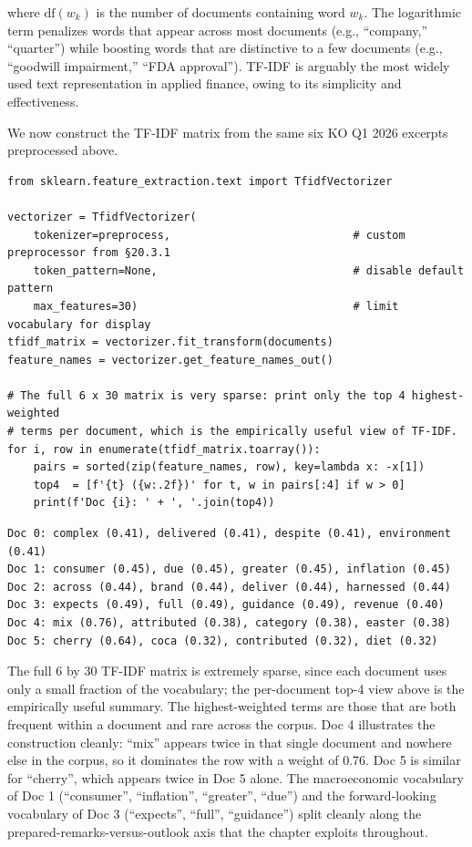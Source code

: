 where $\text{df}(w_k)$ is the number of documents containing word $w_k$. The logarithmic term penalizes words that appear across most documents (e.g., ``company,'' ``quarter'') while boosting words that are distinctive to a few documents (e.g., ``goodwill impairment,'' ``FDA approval''). TF-IDF is arguably the most widely used text representation in applied finance, owing to its simplicity and effectiveness.

We now construct the TF-IDF matrix from the same six KO Q1 2026 excerpts preprocessed above.

\begin{verbatim}
from sklearn.feature_extraction.text import TfidfVectorizer

vectorizer = TfidfVectorizer(
    tokenizer=preprocess,                            # custom preprocessor from §20.3.1
    token_pattern=None,                              # disable default pattern
    max_features=30)                                 # limit vocabulary for display
tfidf_matrix = vectorizer.fit_transform(documents)
feature_names = vectorizer.get_feature_names_out()

# The full 6 x 30 matrix is very sparse: print only the top 4 highest-weighted
# terms per document, which is the empirically useful view of TF-IDF.
for i, row in enumerate(tfidf_matrix.toarray()):
    pairs = sorted(zip(feature_names, row), key=lambda x: -x[1])
    top4  = [f'{t} ({w:.2f})' for t, w in pairs[:4] if w > 0]
    print(f'Doc {i}: ' + ', '.join(top4))
\end{verbatim}

\begin{verbatim}
Doc 0: complex (0.41), delivered (0.41), despite (0.41), environment (0.41)
Doc 1: consumer (0.45), due (0.45), greater (0.45), inflation (0.45)
Doc 2: across (0.44), brand (0.44), deliver (0.44), harnessed (0.44)
Doc 3: expects (0.49), full (0.49), guidance (0.49), revenue (0.40)
Doc 4: mix (0.76), attributed (0.38), category (0.38), easter (0.38)
Doc 5: cherry (0.64), coca (0.32), contributed (0.32), diet (0.32)
\end{verbatim}

The full 6 by 30 TF-IDF matrix is extremely sparse, since each document uses only a small fraction of the vocabulary; the per-document top-4 view above is the empirically useful summary. The highest-weighted terms are those that are both frequent within a document and rare across the corpus. Doc 4 illustrates the construction cleanly: ``mix'' appears twice in that single document and nowhere else in the corpus, so it dominates the row with a weight of 0.76. Doc 5 is similar for ``cherry'', which appears twice in Doc 5 alone. The macroeconomic vocabulary of Doc 1 (``consumer'', ``inflation'', ``greater'', ``due'') and the forward-looking vocabulary of Doc 3 (``expects'', ``full'', ``guidance'') split cleanly along the prepared-remarks-versus-outlook axis that the chapter exploits throughout.

